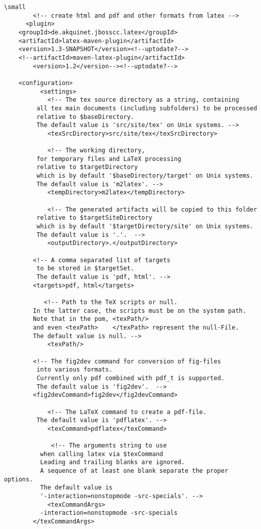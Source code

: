 \documentclass[12pt]{article}
\begin{document}
\lstset{language=xml, basicstyle=\tiny}
\begin{lstlisting}
\small
        <!-- create html and pdf and other formats from latex -->
      <plugin>
	<groupId>de.akquinet.jbosscc.latex</groupId>
	<artifactId>latex-maven-plugin</artifactId>
	<version>1.3-SNAPSHOT</version><!--uptodate?-->
	<!--artifactId>maven-latex-plugin</artifactId>
	    <version>1.2</version--><!--uptodate?-->
	
	<configuration>
          <settings>
            <!-- The tex source directory as a string, containing 
		 all tex main documents (including subfolders) to be processed
		 relative to $baseDirectory. 
		 The default value is 'src/site/tex' on Unix systems. -->
            <texSrcDirectory>src/site/tex</texSrcDirectory>

            <!-- The working directory, 
		 for temporary files and LaTeX processing 
		 relative to $targetDirectory 
		 which is by default '$baseDirectory/target' on Unix systems. 
		 The default value is 'm2latex'. -->
            <tempDirectory>m2latex</tempDirectory>

            <!-- The generated artifacts will be copied to this folder 
		 relative to $targetSiteDirectory 
		 which is by default '$targetDirectory/site' on Unix systems. 
		 The default value is '.'.  -->
            <outputDirectory>.</outputDirectory>

	    <!-- A comma separated list of targets 
		 to be stored in $targetSet. 
		 The default value is 'pdf, html'. -->
	    <targets>pdf, html</targets>

           <!-- Path to the TeX scripts or null. 
		In the latter case, the scripts must be on the system path. 
		Note that in the pom, <texPath/> 
		and even <texPath>    </texPath> represent the null-File. 
		The default value is null. -->
            <texPath/> 

	    <!-- The fig2dev command for conversion of fig-files 
		 into various formats. 
		 Currently only pdf combined with pdf_t is supported. 
		 The default value is 'fig2dev'.  -->
	    <fig2devCommand>fig2dev</fig2devCommand>
  
            <!-- The LaTeX command to create a pdf-file. 
		 The default value is 'pdflatex'. -->
            <texCommand>pdflatex</texCommand>

             <!-- The arguments string to use 
		  when calling latex via $texCommand 
		  Leading and trailing blanks are ignored. 
		  A sequence of at least one blank separate the proper options. 
		  The default value is 
		  '-interaction=nonstopmode -src-specials'. -->
            <texCommandArgs>
	      -interaction=nonstopmode -src-specials
	    </texCommandArgs>


\end{lstlisting}
\end{document}
